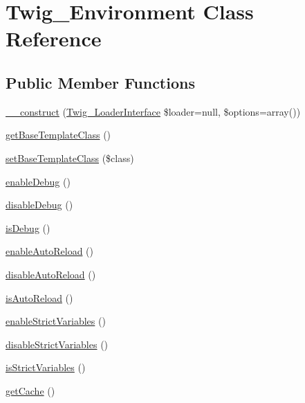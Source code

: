 \hypertarget{class_twig___environment}{}\section{Twig\+\_\+\+Environment Class Reference}
\label{class_twig___environment}
\subsection*{Public Member Functions}
\begin{DoxyCompactItemize}
\item 
\hyperlink{class_twig___environment_aeb7b9fc79ec16f0d18b8685a9302873a}{\+\_\+\+\_\+construct} (\hyperlink{interface_twig___loader_interface}{Twig\+\_\+\+Loader\+Interface} \$loader=null, \$options=array())
\item 
\hyperlink{class_twig___environment_a9f3561c0378f53108aa9673bdd3c63a0}{get\+Base\+Template\+Class} ()
\item 
\hyperlink{class_twig___environment_a923e6b2ef89e647030c100214896548c}{set\+Base\+Template\+Class} (\$class)
\item 
\hyperlink{class_twig___environment_a942b0cfbc1005c9bb0a5f2b0f7d25a25}{enable\+Debug} ()
\item 
\hyperlink{class_twig___environment_ad8fe55ee3d188c1b0d71585653debfef}{disable\+Debug} ()
\item 
\hyperlink{class_twig___environment_a017d21b4d0e1ee6f9cdd9d805793f076}{is\+Debug} ()
\item 
\hyperlink{class_twig___environment_af27b2d02a1bd3d7dc0d2e72dff771cab}{enable\+Auto\+Reload} ()
\item 
\hyperlink{class_twig___environment_a46062846c7f95b6b290e36d90c296491}{disable\+Auto\+Reload} ()
\item 
\hyperlink{class_twig___environment_a7ba43ac4c9bdd0aefcd5140e4ea87a08}{is\+Auto\+Reload} ()
\item 
\hyperlink{class_twig___environment_afe904f5f015cd40f965d5f524611c3fa}{enable\+Strict\+Variables} ()
\item 
\hyperlink{class_twig___environment_a91b21a6aa5aed10b4f89888eaadefc80}{disable\+Strict\+Variables} ()
\item 
\hyperlink{class_twig___environment_ab39d5897ee5022ecc92032d769b9c60c}{is\+Strict\+Variables} ()
\item 
\hyperlink{class_twig___environment_ac4d56a528ec8b416428a2c3c86672dc8}{get\+Cache} ()
\item 

\end{DoxyCompactItemize}
